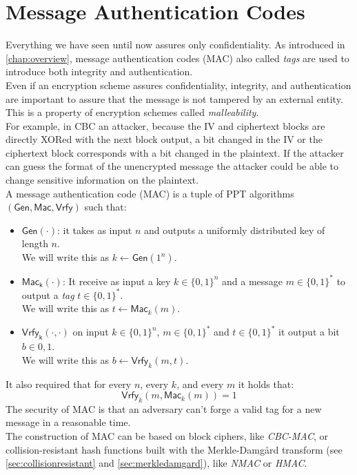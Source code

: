 \section{Message Authentication Codes}\label{sec:mac}
Everything we have seen until now assures only confidentiality. As introduced in \autoref{chap:overview}, message authentication codes (MAC) also called \emph{tags} are used to introduce both integrity and authentication.\\
Even if an encryption scheme assures confidentiality, integrity, and authentication are important to assure that the message is not tampered by an external entity. This is a property of encryption schemes called \emph{malleability}.\\
For example, in CBC an attacker, because the IV and ciphertext blocks are directly XORed with the next block output, a bit changed in the IV or the ciphertext block corresponds with a bit changed in the plaintext. If the attacker can guess the format of the unencrypted message the attacker could be able to change sensitive information on the plaintext.\\
A message authentication code (MAC) is a tuple of PPT algorithms $(\mathsf{Gen},\mathsf{Mac},\mathsf{Vrfy})$ such that:
\begin{itemize}
    \item{$\mathsf{Gen(\cdot)}$: it takes as input $n$ and outputs a uniformly distributed key of length $n$.\\We will write this as $k \leftarrow \mathsf{Gen}(1^n)$.}
    \item{$\mathsf{Mac_k(\cdot)}$: It receive as input a key $k \in \{0,1\}^n$ and a message $m \in \{0,1\}^{*}$ to output a \emph{tag} $t \in \{0,1\}^{*}$.\\We will write this as $t \leftarrow \mathsf{Mac}_k(m)$.}
    \item{$\mathsf{Vrfy_k(\cdot,\cdot)}$ on input $k \in \{0,1\}^n$, $m \in \{0,1\}^{*}$ and $t \in \{0,1\}^{*}$ it output a bit $b \in {0,1}$.\\We will write this as $b \leftarrow \mathsf{Vrfy}_k(m, t)$.}
\end{itemize}
It also required that for every $n$, every $k$, and every $m$ it holds that:
$$
\mathsf{Vrfy}_k(m, \mathsf{Mac}_k(m)) = 1
$$
The security of MAC is that an adversary can't forge a valid tag for a new message in a reasonable time.\\
The construction of MAC can be based on block ciphers, like \emph{CBC-MAC}, or collision-resistant hash functions built with the Merkle-Damg\r{a}rd transform (see \autoref{sec:collisionresistant} and \autoref{sec:merkledamgard}), like \emph{NMAC} or \emph{HMAC}.

